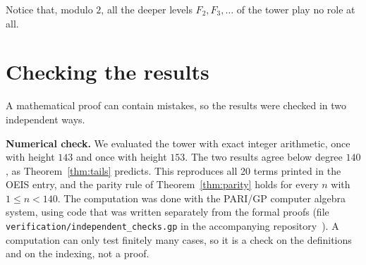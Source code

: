 \documentclass[11pt,a4paper]{article}
\theoremstyle{definition}
\theoremstyle{remark}
\newcommand{\para}[1]{\par\medskip\noindent\textbf{#1}\enspace}
\begin{document}
Notice that, modulo $2$, all the deeper levels $F_2,F_3,\dots$ of the tower play no role at all.

\section{Checking the results}\label{sec:checks}

A mathematical proof can contain mistakes, so the results were checked in two independent ways.

\para{Numerical check.}
We evaluated the tower with exact integer arithmetic, once with height $143$ and once with height $153$. The two
results agree below degree $140$, as Theorem~\ref{thm:tails} predicts. This reproduces all 20 terms printed in the OEIS
entry, and the parity rule of Theorem~\ref{thm:parity} holds for every $n$ with $1\le n<140$.
The computation was done with the PARI/GP computer algebra system, using code that was written separately from the
formal proofs (file \texttt{verification/independent\_checks.gp} in the accompanying repository~\cite{repo}).
A computation can only test finitely many cases, so it is a check on the definitions and on the indexing, not a proof.
\end{document}
